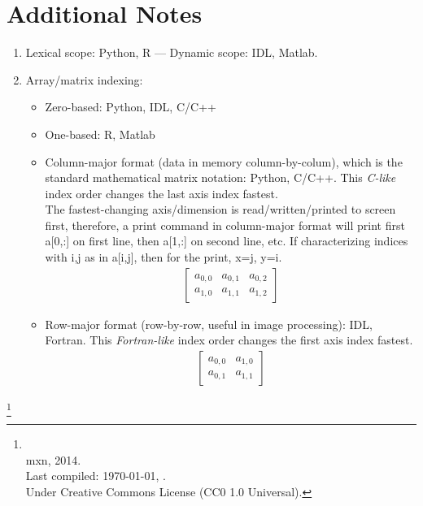 \documentclass[10pt]{article}
\providecommand{\bvec}[1]{\begin{bmatrix}#1\end{bmatrix}}
\begin{document}
\section*{Additional Notes}
\begin{enumerate}
\item Lexical scope: Python, R --- Dynamic scope: IDL, Matlab.
\item Array/matrix indexing:
  \begin{itemize}
  \item Zero-based: Python, IDL, C/C++
  \item One-based: R, Matlab
  \item Column-major format (data in memory column-by-colum), which is
    the standard mathematical matrix notation: Python, C/C++.  This
    \emph{C-like} index order changes the last axis index fastest.\\
    The fastest-changing axis/dimension is read/written/printed to
    screen first, therefore, a print command in column-major format
    will print first a[0,:] on first line, then a[1,:] on second line,
    etc. If characterizing indices with i,j as in a[i,j], then for the
    print, x=j, y=i.
    \begin{align}
      \bvec{a_{0,0}&a_{0,1}&a_{0,2}\\
        a_{1,0}& a_{1,1}&a_{1,2}}
    \end{align}
  \item Row-major format (row-by-row, useful in image processing):
    IDL, Fortran. This \emph{Fortran-like} index order changes the
    first axis index fastest.
    \begin{align}
      \bvec{a_{0,0}&a_{1,0}\\
        a_{0,1}& a_{1,1}}
    \end{align}
  \end{itemize}
\end{enumerate}


\let\thefootnote\relax\footnote{\\
  mxn, 2014.\\
  Last compiled: \small \today, \currenttime.\\
  Under Creative Commons License (CC0 1.0 Universal).}
\end{document}
